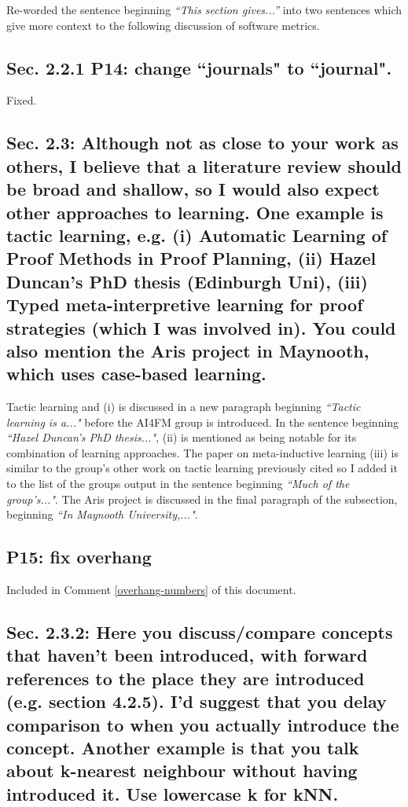 \documentclass[]{article}
\begin{document}
Re-worded the sentence beginning \emph{``This section gives...''} into two sentences which give more context to the following discussion of software metrics. 


\subsection{Sec. 2.2.1 P14: change ``journals" to ``journal".}

Fixed.

\subsection{Sec. 2.3: Although not as close to your work as others, I believe that a literature review should be broad and shallow, so I would also expect other approaches to learning. One example is tactic learning, e.g. (i) Automatic Learning of Proof Methods in Proof Planning, (ii) Hazel Duncan's PhD thesis (Edinburgh Uni), (iii) Typed meta-interpretive learning for proof strategies (which I was involved in). You could also mention the Aris project in Maynooth, which uses case-based learning.}

Tactic learning and (i) is discussed in a new paragraph beginning \emph{``Tactic learning is a..."} before the AI4FM group is introduced.
In the sentence beginning \emph{``Hazel Duncan's PhD thesis..."}, (ii) is mentioned as being notable for its combination of learning approaches.
The paper on meta-inductive learning (iii) is similar to the group's other work on tactic learning previously cited so I added it to the list of the groups output in the sentence beginning \emph{``Much of the group's..."}. The Aris project is discussed in the final paragraph of the subsection, beginning \emph{``In Maynooth University,..."}.


\subsection{P15: fix overhang}

Included in Comment \ref{overhang-numbers} of this document.

\subsection{Sec. 2.3.2: Here you discuss/compare concepts that haven't been introduced, with forward references to the place they are introduced (e.g. section 4.2.5). I'd suggest that you delay comparison to when you actually introduce the concept. Another example is that you talk about k-nearest neighbour without having introduced it. Use lowercase k for kNN.}
\end{document}
